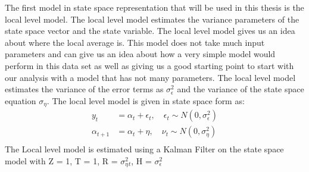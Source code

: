 
The first model in state space representation that will be used in this thesis is the local level model. The local level model estimates the variance parameters of the state space vector and the state variable. The local level model gives us an idea about where the local average is. This model does not take much input parameters and can give us an idea about how a very simple model would perform in this data set as well as giving us a good starting point to start with our analysis with a model that has not many parameters. The local level model estimates the variance of the error terms as $\sigma_{\epsilon}^2$ and the variance of the state space equation $\sigma_{\eta}$. The local level model is given in state space form as:
\begin{equation}
\begin{split}
    y_t &= \alpha_t + \epsilon_t, \quad \epsilon_t \sim N(0,\sigma_\epsilon^2)\\
    \alpha_{t+1} &= \alpha_t + \eta, \quad \nu_t \sim N(0, \sigma_\eta^2)\\
\end{split}
\end{equation}
The Local level model is estimated using a Kalman Filter on the state space model with Z = 1, T = 1, R = $\sigma_\eta^2_t$, H = $\sigma_\epsilon^2$ \\

